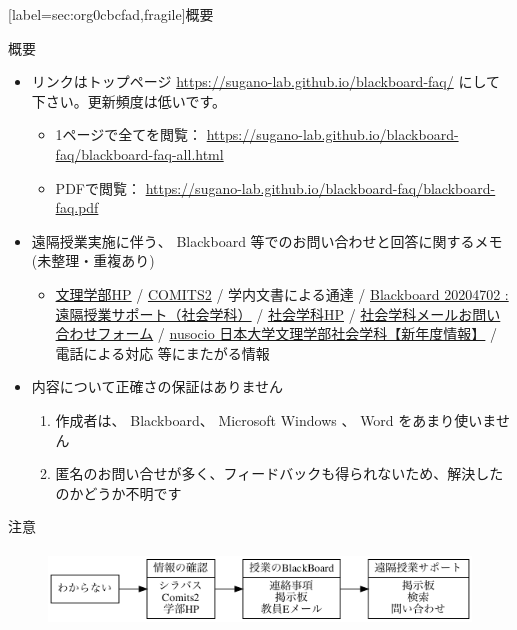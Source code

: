 \documentclass[a4j,10pt]{jsarticle}
\begin{document}
\setcounter{tocdepth}{2}
{\newpage\clearpage
{}%
\begin{frame}
[label={sec:org0cbcfad},fragile]{概要}
\begin{block}{概要}
\begin{itemize}
\item リンクはトップページ \url{https://sugano-lab.github.io/blackboard-faq/} にして下さい。更新頻度は低いです。
\begin{itemize}
\item 1ページで全てを閲覧： \url{https://sugano-lab.github.io/blackboard-faq/blackboard-faq-all.html}
\item PDFで閲覧： \url{https://sugano-lab.github.io/blackboard-faq/blackboard-faq.pdf}
\end{itemize}
\item 遠隔授業実施に伴う、 Blackboard 等でのお問い合わせと回答に関するメモ (未整理・重複あり)
\begin{itemize}
\item \href{https://www.chs.nihon-u.ac.jp/}{文理学部HP} / \href{https://comits2.educ.chs.nihon-u.ac.jp/uniprove\_pt/UnLoginAction}{COMITS2} / 学内文書による通達 / \href{https://nuchs.blackboard.com/webapps/blackboard/execute/launcher?type=Course\&id=\_2302\_1\&url=}{Blackboard 20204702 : 遠隔授業サポート（社会学科）} / \href{http://dep.chs.nihon-u.ac.jp/sociology/index.htm}{社会学科HP} / \href{http://dep.chs.nihon-u.ac.jp/sociology/form.html}{社会学科メールお問い合わせフォーム} / \href{https://sites.google.com/a/nihon-u.ac.jp/nusocio/home}{nusocio 日本大学文理学部社会学科【新年度情報】} / 電話による対応 等にまたがる情報
\end{itemize}
\par
\item 内容について正確さの保証はありません
\begin{enumerate}
\item 作成者は、 Blackboard、 Microsoft Windows 、 Word をあまり使いません
\item 匿名のお問い合せが多く、フィードバックも得られないため、解決したのかどうか不明です
\end{enumerate}
\end{itemize}
\end{block}
\par
\begin{block}{注意}
\begin{figure}[htbp]
\centering
\includegraphics[height=2cm]{figures/blackboard-faq-dot-01.png}

\end{figure}
\end{block}
\end{frame}}
\end{document}
